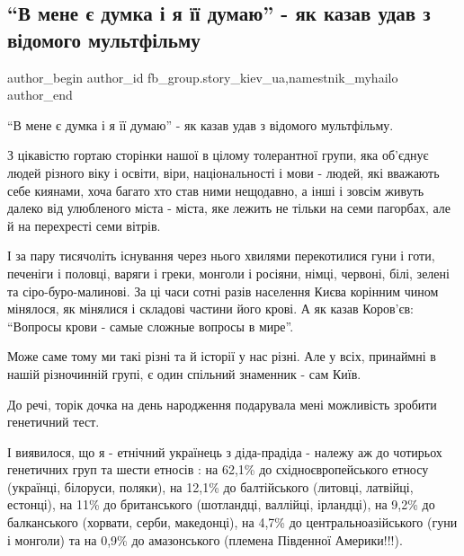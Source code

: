  
 
 
 
 
 
\subsection{\enquote{В мене є думка і я її думаю} - як казав удав з відомого мультфільму}
\label{sec:09_03_2021.fb.fb_group.story_kiev_ua.1.udav}
 
\ifcmt
 author_begin
   author_id fb_group.story_kiev_ua,namestnik_myhailo
 author_end
\fi

\enquote{В мене є думка і я її думаю} - як казав удав з відомого мультфільму.

З цікавістю гортаю сторінки нашої в цілому толерантної групи, яка об'єднує
людей різного віку і освіти, віри, національності і мови - людей, які вважають
себе киянами, хоча багато хто став ними нещодавно, а інші і зовсім живуть
далеко від улюбленого міста - міста, яке лежить не тільки на семи пагорбах, але
й на перехресті семи вітрів.

І за пару тисячоліть існування через нього хвилями перекотилися гуни і готи,
печеніги і половці, варяги і греки, монголи і росіяни, німці, червоні, білі,
зелені та сіро-буро-малинові.  За ці часи сотні разів населення Києва корінним
чином мінялося, як мінялися  і складові частини його крові. А як казав
Коров'єв: \enquote{Вопросы крови - самые сложные вопросы в мире}. 

Може саме тому ми такі різні та й  історії у нас різні. Але у всіх, принаймні в
нашій різночинній групі, є один спільний знаменник - сам Київ. 

До речі, торік дочка на день народження подарувала мені можливість зробити
генетичний тест.

І виявилося, що я - етнічний українець з діда-прадіда - належу аж до чотирьох
генетичних груп та шести етносів : на 62,1\% до східноєвропейського етносу
(українці, білоруси, поляки),  на 12,1\%  до балтійського (литовці, латвійці,
естонці),  на 11\% до британського (шотландці, валлійці, ірландці), на 9,2\% до
балканського (хорвати, серби, македонці), на 4,7\% до центральноазійського (гуни
і монголи) та на 0,9\% до амазонського (племена Південної Америки!!!).

